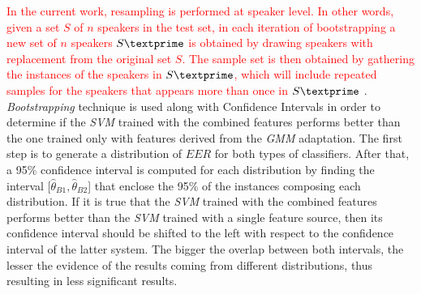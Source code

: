 \textcolor{red}{
  In the current work, resampling is performed at speaker level.
  In other words, given a set $S$ of $n$ speakers in the
  test set, in each iteration of bootstrapping
  a new set of $n$ speakers $S\textprime$ is obtained by drawing speakers with replacement from the
  original set $S$. The sample set is then obtained by gathering the instances of the speakers
  in $S\textprime$, which will include repeated samples for the speakers that appears more than once
  in $S\textprime$
}. \textit{Bootstrapping} technique is used along with Confidence
Intervals in order to determine if the \textit{SVM} trained with the combined features
performs better than the one trained only with features derived from the \textit{GMM} adaptation.
The first step is to generate a distribution of $EER$ for both types of classifiers.
After that,
a 95\% confidence interval is computed for each distribution by finding the interval
[$\hat{\theta}_{B1}, \hat{\theta}_{B2}$] that enclose the 95\% of the instances
composing each distribution.
If it is true that the \textit{SVM} trained with
the combined features performs better than the
\textit{SVM} trained with a single feature source, then its confidence
interval should be shifted to the left with respect to the confidence interval
of the latter system.
The bigger the overlap between both intervals, the
lesser the evidence of the results coming from different distributions, thus
resulting in less significant results.
